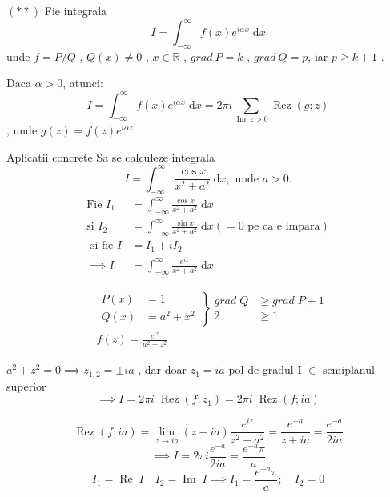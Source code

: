 \documentclass{beamer}
\newcommand{\R}{\mathbb{R}}
\DeclareMathOperator{\Ima}{Im}
\DeclareMathOperator{\Rea}{Re}
\DeclareMathOperator{\Rez}{Rez}
\newcommand{\dd}{\; \mathrm{d}}
\begin{document}
    \begin{frame}
        $(**)$ Fie integrala
        \[
            I = \int_{-\infty}^{\infty} f(x) e^{i \alpha x}\dd x
        \]
        unde $f=P/Q$ , $Q(x)\neq 0$ , $x \in \R$ , $grad\ P = k$ , $grad\ Q =p$,
        iar $p \geq k+1$ .

        Daca $\alpha > 0$, atunci:
        \[
            I = \int_{-\infty}^{\infty} f(x) e^{i \alpha x}\dd x
                =2 \pi i \sum_{\Ima\ z >0} \Rez(g;z)
        \]
        , unde $g(z) = f(z) e^{i \alpha z}$.

    \end{frame}

    \begin{frame}{Aplicatii concrete}
        Sa se calculeze integrala
        \[
            I = \int_{-\infty}^{\infty} \frac{\cos x}{x^2+a^2} \dd x, \text{ unde } a>0 .
        \]
        \begin{align*}
            \text{Fie } I_1 &= \int_{-\infty}^{\infty} \frac{\cos x}{x^2+a^2} \dd x \\
            \text{si }  I_2 &= \int_{-\infty}^{\infty} \frac{\sin x}{x^2+a^2} \dd x (= 0 \text{ pe ca e impara}) \\
            \text{ si fie } I &= I_1 + i I_2 \\
            \implies I &= \int_{-\infty}^{\infty} \frac{e^{ix}}{x^2+a^2} \dd x
        \end{align*}
    \end{frame}

    \begin{frame}
        \begin{align*}
            &\left .
                \begin{aligned}
                    P(x) &= 1 \\
                    Q(x) &= a^2 +x^2
                \end{aligned}
            \right \}
            \begin{aligned}
                grad\; Q &\geq grad\; P+1 \\
                2 &\geq 1
            \end{aligned}
            \\
            &f(z) = \frac{e^{iz}}{a^2 +z^2}
        \end{align*}

        $a^2 +z^2 = 0 \implies z_{1,2} = \pm i a$ , dar doar $z_1 = i a$
        pol de gradul I $\in$ semiplanul superior
        \[
            \implies I = 2 \pi i\; \Rez(f;z_1) = 2 \pi i\; \Rez(f;i a)
        \]
    \end{frame}
    \begin{frame}
        \[
            \Rez(f;i a) = \lim_{z \to ia} (z - i a) \frac{e^{iz}}{z^2+a^2}
                = \frac{e^{-a}}{z + i a} = \frac{e^{-a}}{2ia}
        \]
        \[
            \implies I = 2 \pi i \frac{e^{-a}}{2ia} = \frac{e^{-a}\pi}{a}
        \]
        \[
            I_1 = \Rea \; I \quad I_2=\Ima \; I
                \implies I_1 = \frac{e^{-a}\pi}{a}; \quad I_2 = 0
        \]
    \end{frame}
\end{document}
